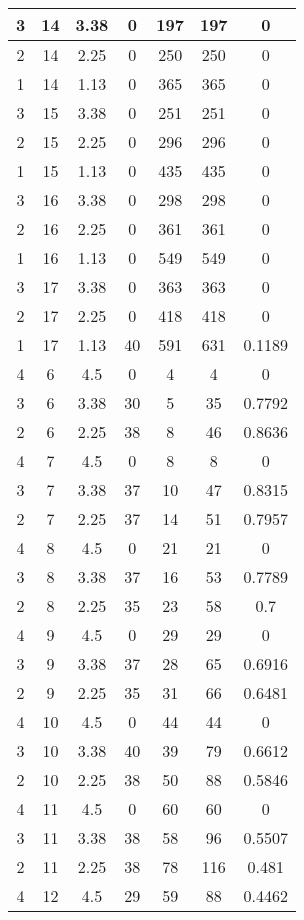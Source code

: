 \documentclass[letterpaper, 12pt]{article}
\begin{document}
\begin{longtable}{|c|c|c|c|c|c|c|}
\hline
3 & 14 & 3.38 & 0 & 197 & 197 & 0 \\
\hline
2 & 14 & 2.25 & 0 & 250 & 250 & 0 \\
\hline
1 & 14 & 1.13 & 0 & 365 & 365 & 0 \\
\hline
3 & 15 & 3.38 & 0 & 251 & 251 & 0 \\
\hline
2 & 15 & 2.25 & 0 & 296 & 296 & 0 \\
\hline
1 & 15 & 1.13 & 0 & 435 & 435 & 0 \\
\hline
3 & 16 & 3.38 & 0 & 298 & 298 & 0 \\
\hline
2 & 16 & 2.25 & 0 & 361 & 361 & 0 \\
\hline
1 & 16 & 1.13 & 0 & 549 & 549 & 0 \\
\hline
3 & 17 & 3.38 & 0 & 363 & 363 & 0 \\
\hline
2 & 17 & 2.25 & 0 & 418 & 418 & 0 \\
\hline
1 & 17 & 1.13 & 40 & 591 & 631 & 0.1189 \\
\hline
4 & 6 & 4.5 & 0 & 4 & 4 & 0 \\
\hline
3 & 6 & 3.38 & 30 & 5 & 35 & 0.7792 \\
\hline
2 & 6 & 2.25 & 38 & 8 & 46 & 0.8636 \\
\hline
4 & 7 & 4.5 & 0 & 8 & 8 & 0 \\
\hline
3 & 7 & 3.38 & 37 & 10 & 47 & 0.8315 \\
\hline
2 & 7 & 2.25 & 37 & 14 & 51 & 0.7957 \\
\hline
4 & 8 & 4.5 & 0 & 21 & 21 & 0 \\
\hline
3 & 8 & 3.38 & 37 & 16 & 53 & 0.7789 \\
\hline
2 & 8 & 2.25 & 35 & 23 & 58 & 0.7 \\
\hline
4 & 9 & 4.5 & 0 & 29 & 29 & 0 \\
\hline
3 & 9 & 3.38 & 37 & 28 & 65 & 0.6916 \\
\hline
2 & 9 & 2.25 & 35 & 31 & 66 & 0.6481 \\
\hline
4 & 10 & 4.5 & 0 & 44 & 44 & 0 \\
\hline
3 & 10 & 3.38 & 40 & 39 & 79 & 0.6612 \\
\hline
2 & 10 & 2.25 & 38 & 50 & 88 & 0.5846 \\
\hline
4 & 11 & 4.5 & 0 & 60 & 60 & 0 \\
\hline
3 & 11 & 3.38 & 38 & 58 & 96 & 0.5507 \\
\hline
2 & 11 & 2.25 & 38 & 78 & 116 & 0.481 \\
\hline
4 & 12 & 4.5 & 29 & 59 & 88 & 0.4462 \\

\end{longtable}
\end{document}
